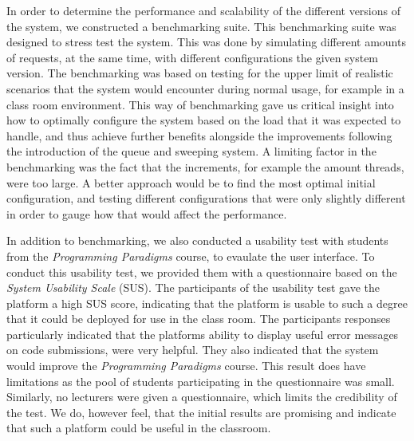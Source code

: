 In order to determine the performance and scalability of the different versions of the system, we constructed a benchmarking suite. 
This benchmarking suite was designed to stress test the system. 
This was done by simulating different amounts of requests, at the same time, with different configurations the given system version. The benchmarking was based on testing for the upper limit of realistic scenarios that the system would encounter during normal usage, for example in a class room environment. 
This way of benchmarking gave us critical insight into how to optimally configure the system based on the load that it was expected to handle, and thus achieve further benefits alongside the improvements following the introduction of the queue and sweeping system. A limiting factor in the benchmarking was the fact that the increments, for example the amount threads, were too large. 
A better approach would be to find the most optimal initial configuration, and testing different configurations that were only slightly different in order to gauge how that would affect the performance. 

In addition to benchmarking, we also conducted a usability test with students from the \textit{Programming Paradigms} course, to evaulate the user interface. To conduct this usability test, we provided them with a questionnaire based on the \textit{System Usability Scale} (SUS). 
The participants of the usability test gave the platform a high SUS score, indicating that the platform is usable to such a degree that it could be deployed for use in the class room. The participants responses particularly indicated that the platforms ability to display useful error messages on code submissions, were very helpful. 
They also indicated that the system would improve the \textit{Programming Paradigms} course. This result does have limitations as the pool of students participating in the questionnaire was small. 
Similarly, no lecturers were given a questionnaire, which limits the credibility of the test. We do, however feel, that the initial results are promising and indicate that such a platform could be useful in the classroom.
 


